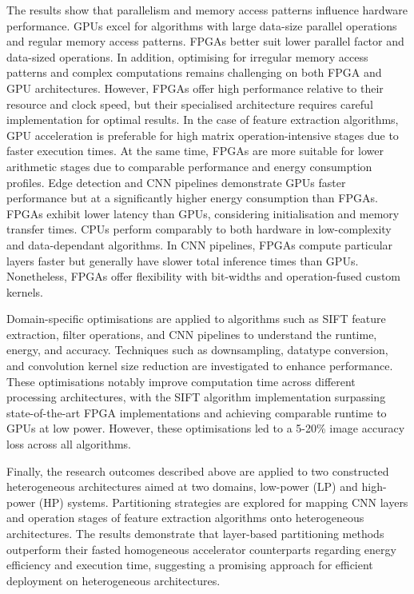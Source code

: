 The results show that parallelism and memory access patterns influence hardware performance. GPUs excel for algorithms with large data-size parallel operations and regular memory access patterns. FPGAs better suit lower parallel factor and data-sized operations. In addition, optimising for irregular memory access patterns and complex computations remains challenging on both FPGA and GPU architectures. However, FPGAs offer high performance relative to their resource and clock speed, but their specialised architecture requires careful implementation for optimal results. In the case of feature extraction algorithms, GPU acceleration is preferable for high matrix operation-intensive stages due to faster execution times. At the same time, FPGAs are more suitable for lower arithmetic stages due to comparable performance and energy consumption profiles. Edge detection and CNN pipelines demonstrate GPUs faster performance but at a significantly higher energy consumption than FPGAs. FPGAs exhibit lower latency than GPUs, considering initialisation and memory transfer times. CPUs perform comparably to both hardware in low-complexity and data-dependant algorithms. In CNN pipelines, FPGAs compute particular layers faster but generally have slower total inference times than GPUs. Nonetheless, FPGAs offer flexibility with bit-widths and operation-fused custom kernels.

Domain-specific optimisations are applied to algorithms such as SIFT feature extraction, filter operations, and CNN pipelines to understand the runtime, energy, and accuracy. Techniques such as downsampling, datatype conversion, and convolution kernel size reduction are investigated to enhance performance. These optimisations notably improve computation time across different processing architectures, with the SIFT algorithm implementation surpassing state-of-the-art FPGA implementations and achieving comparable runtime to GPUs at low power. However, these optimisations led to a 5-20\% image accuracy loss across all algorithms.

Finally, the research outcomes described above are applied to two constructed heterogeneous architectures aimed at two domains, low-power (LP) and high-power (HP) systems. Partitioning strategies are explored for mapping CNN layers and operation stages of feature extraction algorithms onto heterogeneous architectures. The results demonstrate that layer-based partitioning methods outperform their fasted homogeneous accelerator counterparts regarding energy efficiency and execution time, suggesting a promising approach for efficient deployment on heterogeneous architectures.




